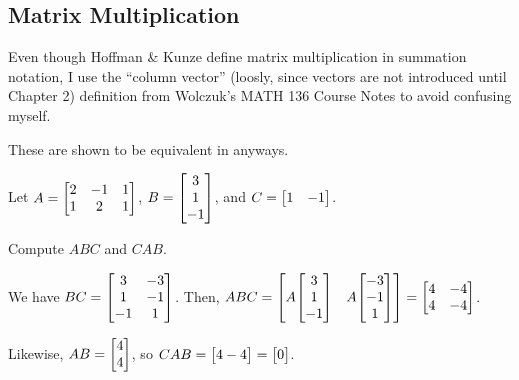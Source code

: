 \documentclass{agony}
\begin{document}
\subsection{Matrix Multiplication}

Even though Hoffman \& Kunze define matrix multiplication in summation notation,
I use the ``column vector'' (loosly, since vectors are not introduced until Chapter 2) definition
from Wolczuk's MATH 136 Course Notes to avoid confusing myself.

These are shown to be equivalent in  anyways.

\begin{xca}
  Let $A = \mqty[2&-1&1 \\ 1&2&1]$, $B = \mqty[3\\1\\-1]$, and $C = \mqty[1&-1]$.

  Compute $ABC$ and $CAB$.
\end{xca}
\begin{sol}
  We have $BC = \mqty[3&-3 \\ 1&-1 \\ -1&1]$.
  Then, $ABC = \mqty[A\mqty[3\\1\\-1] & A\mqty[-3\\-1\\1]] = \mqty[4&-4 \\ 4&-4]$.

  Likewise, $AB = \mqty[4\\4]$, so $CAB = \mqty[4-4] = \mqty[0]$.
\end{sol}
\end{document}
